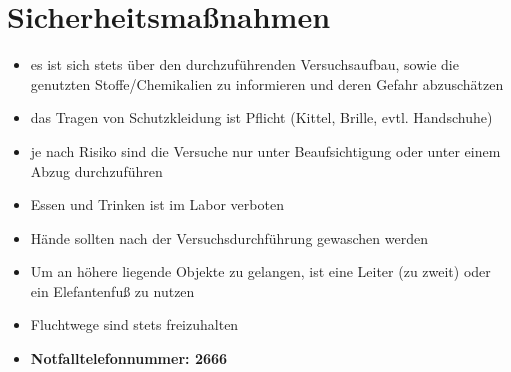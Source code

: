 \section{Sicherheitsmaßnahmen}
\begin{itemize}
	\item es ist sich stets über den durchzuführenden Versuchsaufbau, sowie die genutzten Stoffe/Chemikalien zu informieren und deren Gefahr abzuschätzen
	\item das Tragen von Schutzkleidung ist Pflicht (Kittel, Brille, evtl. Handschuhe)
	\item je nach Risiko sind die Versuche nur unter Beaufsichtigung oder unter einem Abzug durchzuführen
	\item  Essen und Trinken ist im Labor verboten
	\item  Hände sollten nach der Versuchsdurchführung gewaschen werden 
	\item Um an höhere liegende Objekte zu gelangen, ist eine Leiter (zu zweit) oder ein Elefantenfuß zu nutzen
	\item Fluchtwege sind stets freizuhalten
	\item \textbf{Notfalltelefonnummer: 2666}
\end{itemize}
